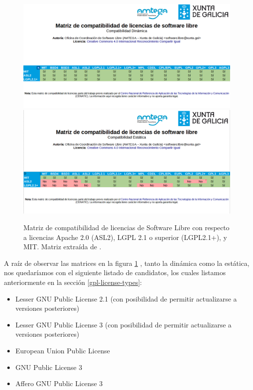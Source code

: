 \begin{center}
	\begin{figure}[h]
		\includegraphics[width=\textwidth]{imagenes/MatrizCompatibilidadDinamica.png}
		\includegraphics[width=\textwidth]{imagenes/MatrizCompatibilidadEstatica.png}
		\caption{Matriz de compatibilidad de licencias de Software Libre con respecto a licencias Apache 2.0 (ASL2), LGPL 2.1 o superior (LGPL2.1+), y MIT. Matriz extraída de \cite{matriz-licencias}.}
		\label{fig:matrices-comp}
	\end{figure}
\end{center}

A raíz de observar las matrices en la figura \ref{fig:matrices-comp} , tanto la dinámica como la estática, nos quedaríamos con el siguiente listado de candidatos, los cuales listamos anteriormente en la sección \ref{gpl-license-types}:
\begin{itemize}
	\item Lesser GNU Public License 2.1 (con posibilidad de permitir actualizarse a versiones posteriores)
	\item Lesser GNU Public License 3 (con posibilidad de permitir actualizarse a versiones posteriores)
	\item European Union Public License
	\item GNU Public License 3
	\item Affero GNU Public License 3
\end{itemize}

